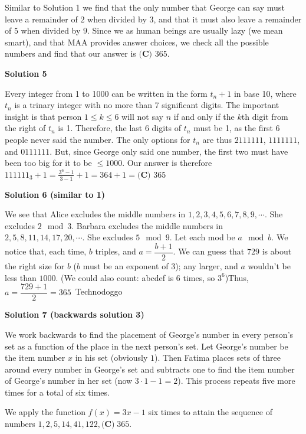 \begin{enumerate}
Similar to Solution 1 we find that the only number that George can say must leave a remainder of $2$ when divided by $3$, and that it must also leave a remainder of $5$ when divided by $9$. Since we as human beings are usually lazy (we mean smart), and that MAA provides answer choices, we check all the possible numbers and find that our answer is $\boxed{\textbf{(C) } 365}$.

 



\textbf{Solution 5}

Every integer from 1 to 1000 can be written in the form $t_n+1$ in base 10, where $t_n$ is a trinary integer with no more than 7 significant digits. The important insight is that person $1\le{k}\le6$ will not say $n$ if and only if the $k$th digit from the right of $t_n$ is 1. Therefore, the last 6 digits of $t_n$ must be 1, as the first 6 people never said the number. The only options for $t_n$ are thus $2111111$, $1111111$, and $0111111$. But, since George only said one number, the first two must have been too big for it to be $\le1000$. Our answer is therefore $111111_3+1=\frac{3^6-1}{3-1}+1=364+1=\boxed{\textbf{(C) } 365}$




\textbf{Solution 6 (similar to 1)}

We see that Alice excludes the middle numbers in $1,2,3,4,5,6,7,8,9,\cdots.$ She excludes $2\mod3.$ Barbara excludes the middle numbers in $2,5,8,11,14,17,20,\cdots.$ She excludes $5\mod9.$ Let each mod be $a\mod b.$ We notice that, each time, $b$ triples, and $a=\dfrac{b+1}2.$ We can guess that $729$ is about the right size for $b$ ($b$ must be an exponent of $3$); any larger, and $a$ wouldn't be less than $1000.$ (We could also count: abcdef is $6$ times, so $3^6$)Thus, $a=\dfrac{729+1}2=365$~Technodoggo

 



\textbf{Solution 7 (backwards solution 3)}

We work backwards to find the placement of George's number in every person's set as a function of the place in the next person's set. Let George's number be the item number $x$ in his set (obviously $1$). Then Fatima places sets of three around every number in George's set and subtracts one to find the item number of George's number in her set (now $3\cdot 1-1=2$). This process repeats five more times for a total of six times.

 We apply the function $f(x)=3x-1$ six times to attain the sequence of numbers $1,2,5,14,41,122,\boxed{\textbf{(C)}\;365}$.


\end{enumerate}
